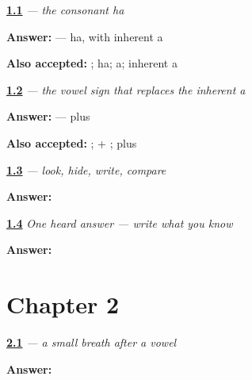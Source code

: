\noindent\begin{minipage}[t]{\linewidth}
\raggedright
\hyperlink{review-MR-W01-ha-observe-check}{\textbf{1.1}} \emph{ — the consonant ha}\par
\small \textbf{Answer:}  — ha, with inherent a\par
\footnotesize \textbf{Also accepted:} ; ha; a; inherent a
\end{minipage}\par\medskip

\noindent\begin{minipage}[t]{\linewidth}
\raggedright
\hyperlink{review-MR-W01-o-matra-guided-copy-check}{\textbf{1.2}} \emph{ — the vowel sign that replaces the inherent a}\par
\small \textbf{Answer:}  —  plus \par
\footnotesize \textbf{Also accepted:} ;  + ;  plus 
\end{minipage}\par\medskip

\noindent\begin{minipage}[t]{\linewidth}
\raggedright
\hyperlink{review-MR-W01-ho-delayed-copy-check}{\textbf{1.3}} \emph{ — look, hide, write, compare}\par
\small \textbf{Answer:} \par
\end{minipage}\par\medskip

\noindent\begin{minipage}[t]{\linewidth}
\raggedright
\hyperlink{review-MR-W01-ho-dictation-answer}{\textbf{1.4}} \emph{One heard answer — write what you know}\par
\small \textbf{Answer:} \par
\end{minipage}\par\medskip

\section*{Chapter 2}

\noindent\begin{minipage}[t]{\linewidth}
\raggedright
\hyperlink{review-MR-W02-visarga-model}{\textbf{2.1}} \emph{ — a small breath after a vowel}\par
\small \textbf{Answer:} \par
\end{minipage}\par\medskip

